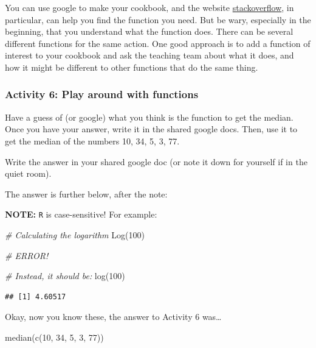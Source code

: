 \documentclass[
]{book}
\newenvironment{Shaded}{\begin{snugshade}}{\end{snugshade}}
\newcommand{\CommentTok}[1]{\textcolor[rgb]{0.56,0.35,0.01}{\textit{#1}}}
\newcommand{\DecValTok}[1]{\textcolor[rgb]{0.00,0.00,0.81}{#1}}
\newcommand{\FunctionTok}[1]{\textcolor[rgb]{0.00,0.00,0.00}{#1}}
\newcommand{\NormalTok}[1]{#1}
\begin{document}
You can use google to make your cookbook, and the website \href{https://stackoverflow.com/}{stackoverflow}, in particular, can help you find the function you need. But be wary, especially in the beginning, that you understand what the function does. There can be several different functions for the same action. One good approach is to add a function of interest to your cookbook and ask the teaching team about what it does, and how it might be different to other functions that do the same thing.

\hypertarget{activity-6-play-around-with-functions}{%
\subsubsection{Activity 6: Play around with functions}\label{activity-6-play-around-with-functions}}

Have a guess of (or google) what you think is the function to get the median. Once you have your answer, write it in the shared google docs. Then, use it to get the median of the numbers 10, 34, 5, 3, 77.

Write the answer in your shared google doc (or note it down for yourself if in the quiet room).

The answer is further below, after the note:

\textbf{NOTE:} \texttt{R} is case-sensitive! For example:

\begin{Shaded}
\begin{Highlighting}[]
\CommentTok{\# Calculating the logarithm }
\FunctionTok{Log}\NormalTok{(}\DecValTok{100}\NormalTok{)}

\CommentTok{\# ERROR!}
\end{Highlighting}
\end{Shaded}

\begin{Shaded}
\begin{Highlighting}[]
\CommentTok{\# Instead, it should be:}
\FunctionTok{log}\NormalTok{(}\DecValTok{100}\NormalTok{)}
\end{Highlighting}
\end{Shaded}

\begin{verbatim}
## [1] 4.60517
\end{verbatim}

Okay, now you know these, the answer to Activity 6 was\ldots{}

\begin{Shaded}
\begin{Highlighting}[]
\FunctionTok{median}\NormalTok{(}\FunctionTok{c}\NormalTok{(}\DecValTok{10}\NormalTok{, }\DecValTok{34}\NormalTok{, }\DecValTok{5}\NormalTok{, }\DecValTok{3}\NormalTok{, }\DecValTok{77}\NormalTok{))}
\end{Highlighting}
\end{Shaded}
\end{document}
